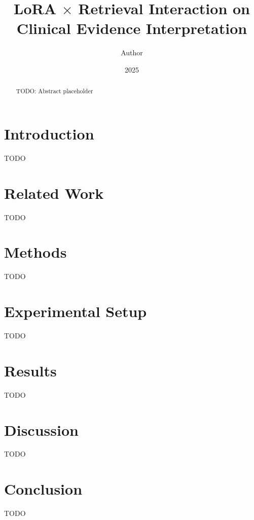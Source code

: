 \documentclass{article}
\title{LoRA $\times$ Retrieval Interaction on Clinical Evidence Interpretation}
\author{Author}
\date{2025}
\begin{document}
\maketitle

\begin{abstract}
TODO: Abstract placeholder
\end{abstract}

\section{Introduction}
TODO

\section{Related Work}
TODO

\section{Methods}
TODO

\section{Experimental Setup}
TODO

\section{Results}
TODO

\section{Discussion}
TODO

\section{Conclusion}
TODO



\end{document}
